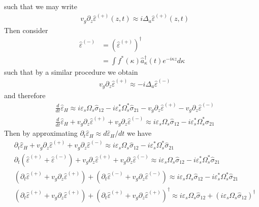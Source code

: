 \documentclass[aps,pra,showpacs,amsmath,amssymb,nofootinbib,longbibliography,superscriptaddress
]{revtex4-1}
\theoremstyle{definition}
\theoremstyle{remark}
\newcommand{\0}{\hat{0}}
\begin{document}
such that we may write
\begin{align}
    & v_g \partial_z \hat{\varepsilon}^{(+)}(z,t) \approx i \Delta_a \hat{\varepsilon}^{(+)}(z,t)
\end{align}
Then consider
\begin{align}
    \hat{\varepsilon}^{(-)} &= \left(\hat{\varepsilon}^{(+)}\right)^{\dagger} \nonumber \\
    &= \int f^*(\kappa) \hat{a}_{\kappa}^{\dagger}(t) e^{-i \kappa z} d\kappa
\end{align}
such that by a similar procedure we obtain
\begin{align}
    &v_g \partial_z \hat{\varepsilon}^{(+)} \approx -i \Delta_a \hat{\varepsilon}^{(-)}
\end{align}
and therefore
\begin{align}
    &\frac{d}{dt}\hat{\varepsilon}_H
    \approx
    i \varepsilon_s \Omega_{s} \hat{\sigma}_{12} - i \varepsilon_s^* \Omega_{s}^* \hat{\sigma}_{21} - v_g \partial_z \hat{\varepsilon}^{(+)} - v_g \partial_z \hat{\varepsilon}^{(-)} \nonumber \\
    &\frac{d}{dt}\hat{\varepsilon}_H + v_g \partial_z \hat{\varepsilon}^{(+)} + v_g \partial_z \hat{\varepsilon}^{(-)}
    \approx
    i \varepsilon_s \Omega_{s} \hat{\sigma}_{12} - i \varepsilon_s^* \Omega_{s}^* \hat{\sigma}_{21}
\end{align}
Then by approximating $\partial_t \hat{\varepsilon}_H \approx d \hat{\varepsilon}_H / dt$ we have
\begin{align}
    &\partial_t \hat{\varepsilon}_H + v_g \partial_z \hat{\varepsilon}^{(+)} + v_g \partial_z \hat{\varepsilon}^{(-)}
    \approx
    i \varepsilon_s \Omega_{s} \hat{\sigma}_{12} - i \varepsilon_s^* \Omega_{s}^* \hat{\sigma}_{21} \nonumber \\
    &\partial_t \left(\hat{\varepsilon}^{(+)} + \hat{\varepsilon}^{(-)}\right) + v_g \partial_z \hat{\varepsilon}^{(+)} + v_g \partial_z \hat{\varepsilon}^{(-)}
    \approx
    i \varepsilon_s \Omega_{s} \hat{\sigma}_{12} - i \varepsilon_s^* \Omega_{s}^* \hat{\sigma}_{21} \nonumber \\
    &\left(\partial_t \hat{\varepsilon}^{(+)} + v_g \partial_z \hat{\varepsilon}^{(+)}\right) + \left(\partial_t \hat{\varepsilon}^{(-)} + v_g \partial_z \hat{\varepsilon}^{(-)}\right)
    \approx
    i \varepsilon_s \Omega_{s} \hat{\sigma}_{12} - i \varepsilon_s^* \Omega_{s}^* \hat{\sigma}_{21} \nonumber \\
    &\left(\partial_t \hat{\varepsilon}^{(+)} + v_g \partial_z \hat{\varepsilon}^{(+)}\right) + \left(\partial_t \hat{\varepsilon}^{(+)} + v_g \partial_z \hat{\varepsilon}^{(+)}\right)^{\dagger}
    \approx
    i \varepsilon_s \Omega_{s} \hat{\sigma}_{12} + \left(i \varepsilon_s \Omega_{s} \hat{\sigma}_{12}\right)^{\dagger}
\end{align}
\end{document}
